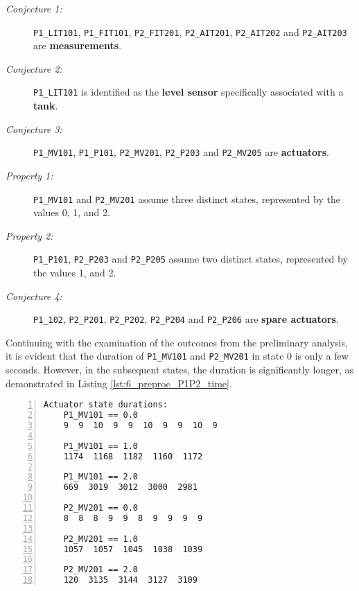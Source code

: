 \begin{description}
	\item[\colorbox{backcolourtext}{\normalfont\textit{Conjecture 1:}}] \texttt{P1\_LIT101}, \texttt{P1\_FIT101}, \texttt{P2\_FIT201}, \texttt{P2\_AIT201}, \texttt{P2\_AIT202} and \texttt{P2\_AIT203} are \textbf{measurements}.
	
	\item[\colorbox{backcolourtext}{\normalfont\textit{Conjecture 2:}}] \texttt{P1\_LIT101} is identified as the \textbf{level sensor} specifically associated with a \textbf{tank}.
	
	\item[\colorbox{backcolourtext}{\normalfont\textit{Conjecture 3:}}] \texttt{P1\_MV101}, \texttt{P1\_P101}, \texttt{P2\_MV201}, \texttt{P2\_P203} and \texttt{P2\_MV205} are \textbf{actuators}.
	
	\item[\colorbox{backcolourtext}{\normalfont\textit{Property 1:}}] \texttt{P1\_MV101} and \texttt{P2\_MV201} assume three distinct states, represented by the values 0, 1, and 2.
	
	\item[\colorbox{backcolourtext}{\normalfont\textit{Property 2:}}] \texttt{P1\_P101}, \texttt{P2\_P203} and \texttt{P2\_P205} assume two distinct states, represented by the values 1, and 2.
	
	\item[\colorbox{backcolourtext}{\normalfont\textit{Conjecture 4:}}] \texttt{P1\_102}, \texttt{P2\_P201}, \texttt{P2\_P202}, \texttt{P2\_P204} and \texttt{P2\_P206} are \textbf{spare actuators}.
	
\end{description}

Continuing with the examination of the outcomes from the preliminary analysis, it is evident that the duration of \texttt{P1\_MV101} and \texttt{P2\_MV201} in state 0 is only a few seconds. However, in the subsequent states, the duration is significantly longer, as demonstrated in Listing \ref{lst:6_preproc_P1P2_time}. 

\begin{lstlisting}[language=bash, numbers=left, caption=Time duration of the states of actuators MV101 and MV201 of PLC1-2, label=lst:6_preproc_P1P2_time]
	Actuator state durations:
	P1_MV101 == 0.0
	9  9  10  9  9  10  9  9  10  9
	
	P1_MV101 == 1.0
	1174  1168  1182  1160  1172
	
	P1_MV101 == 2.0
	669  3019  3012  3000  2981
	
	P2_MV201 == 0.0
	8  8  8  9  9  8  9  9  9  9
	
	P2_MV201 == 1.0
	1057  1057  1045  1038  1039
	
	P2_MV201 == 2.0
	120  3135  3144  3127  3109
\end{lstlisting}

